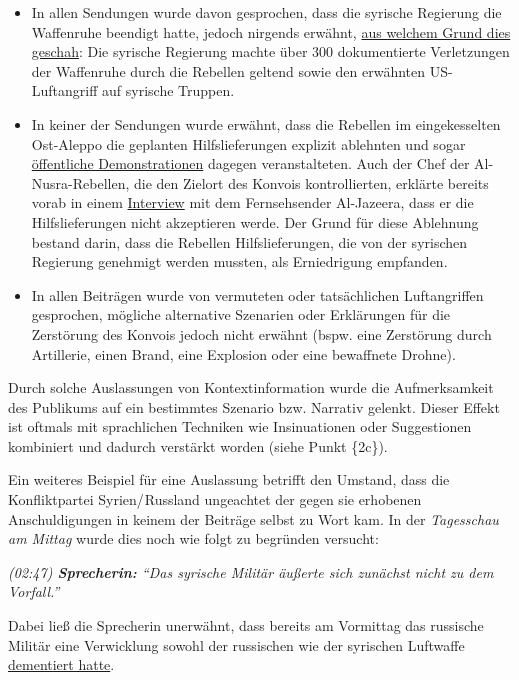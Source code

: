 \begin{itemize}
\tightlist
\item
  In allen Sendungen wurde davon gesprochen, dass die syrische Regierung
  die Waffenruhe beendigt hatte, jedoch nirgends erwähnt,
  \href{http://www.latimes.com/world/la-fg-syria-cease-fire-20160919-snap-story.html}{aus
  welchem Grund dies geschah}: Die syrische Regierung machte über 300
  dokumentierte Verletzungen der Waffenruhe durch die Rebellen geltend
  sowie den erwähnten US-Luftangriff auf syrische Truppen.
\item
  In keiner der Sendungen wurde erwähnt, dass die Rebellen im
  eingekesselten Ost-Aleppo die geplanten Hilfslieferungen explizit
  ablehnten und sogar
  \href{https://web.archive.org/web/20170202013724/http://ogn.news/306/}{öffentliche
  Demonstrationen} dagegen veranstalteten. Auch der Chef der
  Al-Nusra-Rebellen, die den Zielort des Konvois kontrollierten,
  erklärte bereits vorab in einem
  \href{https://www.alaraby.co.uk/english/news/2016/9/17/us-has-surrendered-to-assad-says-jfs-head}{Interview}
  mit dem Fernsehsender Al-Jazeera, dass er die Hilfslieferungen nicht
  akzeptieren werde. Der Grund für diese Ablehnung bestand darin, dass
  die Rebellen Hilfslieferungen, die von der syrischen Regierung
  genehmigt werden mussten, als Erniedrigung empfanden.
\item
  In allen Beiträgen wurde von vermuteten oder tatsächlichen
  Luftangriffen gesprochen, mögliche alternative Szenarien oder
  Erklärungen für die Zerstörung des Konvois jedoch nicht erwähnt (bspw.
  eine Zerstörung durch Artillerie, einen Brand, eine Explosion oder
  eine bewaffnete Drohne).
\end{itemize}

Durch solche Auslassungen von Kontextinformation wurde die
Aufmerksamkeit des Publikums auf ein bestimmtes Szenario bzw. Narrativ
gelenkt. Dieser Effekt ist oftmals mit sprachlichen Techniken wie
Insinuationen oder Suggestionen kombiniert und dadurch verstärkt worden
(siehe Punkt \{2c\}).

Ein weiteres Beispiel für eine Auslassung betrifft den Umstand, dass die
Konfliktpartei Syrien/ Russland ungeachtet der gegen sie erhobenen
Anschuldigungen in keinem der Beiträge selbst zu Wort kam. In der
\emph{Tagesschau am Mittag} wurde dies noch wie folgt zu begründen
versucht:

\emph{(02:47) \textbf{Sprecherin:} ``Das syrische Militär äußerte sich
zunächst nicht zu dem Vorfall.''}

Dabei ließ die Sprecherin unerwähnt, dass bereits am Vormittag das
russische Militär eine Verwicklung sowohl der russischen wie der
syrischen Luftwaffe
\href{http://www.wsj.com/articles/death-toll-rises-in-syria-aid-convoy-attack-1474370636}{dementiert
hatte}.

